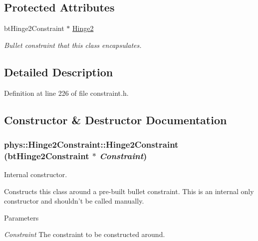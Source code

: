\subsection*{Protected Attributes}
\begin{DoxyCompactItemize}
\item 
\hypertarget{classphys_1_1Hinge2Constraint_aa32c384f4c51895001e4378342d8f45e}{
btHinge2Constraint $\ast$ \hyperlink{classphys_1_1Hinge2Constraint_aa32c384f4c51895001e4378342d8f45e}{Hinge2}}
\label{d2/d16/classphys_1_1Hinge2Constraint_aa32c384f4c51895001e4378342d8f45e}

\begin{DoxyCompactList}\small\item\em Bullet constraint that this class encapsulates. \item\end{DoxyCompactList}\end{DoxyCompactItemize}


\subsection{Detailed Description}


Definition at line 226 of file constraint.h.



\subsection{Constructor \& Destructor Documentation}
\hypertarget{classphys_1_1Hinge2Constraint_aaf937ddb299b8b47e243e83dfd585e44}{
\subsubsection[{Hinge2Constraint}]{\setlength{\rightskip}{0pt plus 5cm}phys::Hinge2Constraint::Hinge2Constraint (btHinge2Constraint $\ast$ {\em Constraint})}}
\label{d2/d16/classphys_1_1Hinge2Constraint_aaf937ddb299b8b47e243e83dfd585e44}


Internal constructor. 

Constructs this class around a pre-\/built bullet constraint. This is an internal only constructor and shouldn't be called manually. 
\begin{DoxyParams}{Parameters}
\item[{\em Constraint}]The constraint to be constructed around. \end{DoxyParams}


